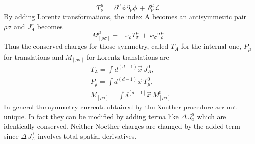 \documentclass[a4paper,10pt]{article}
\begin{document}
\begin{equation}
 T^\mu_\nu=\, \partial^\mu\phi\,\partial_\nu\phi\,+\,\delta^\mu_\nu\mathcal{L}
\end{equation}
By adding Lorentz transformations, the index A becomes an antisymmetric pair $\rho\sigma$
and $J^\mu_A$ becomes
\begin{equation}
 M^\mu_{[\rho \sigma]}=-x_\rho T^\mu_\sigma \, + \, x_\sigma T^\mu_\rho
\end{equation}
Thus the conserved charges for those symmetry, called $T_A$ for the internal one, $P_\mu$ for translations and $M_{[\rho \sigma]}$ for Lorentz translations are
\begin{equation}
 \begin{align}
  &T_A=\int{d^{(d-1)}\overrightarrow{x}\,J^0_A},\\
  &P_\mu=\int{d^{(d-1)}\overrightarrow{x}\,T^0_\mu},\\
  &M_{[\rho \sigma]}=\int{d^{[d-1]}\overrightarrow{x}\,M^0_{[\rho \sigma]}}
 \end{align}
\end{equation}
In general the symmetry currents obtained by the Noether procedure are not unique.
In fact they can be modified by adding terma like $\Delta\,J^\mu_a$ which are identically conserved.
Neither Noether charges are changed by the added term since $\Delta\,J^0_A$ involves total spatial derivatives.
\end{document}
